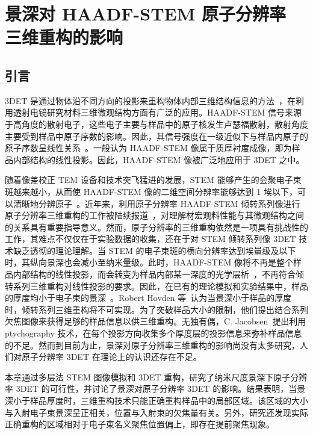 
\clearemptydoublepage
\chapter[景深对 HAADF-STEM 原子分辨率三维重构的影响]{景深对 HAADF-STEM 原子分辨率\\三维重构的影响}
\section{引言}
3DET 是通过物体沿不同方向的投影来重构物体内部三维结构信息的方法~\cite{Frank2006,Kubel2005}，在利用透射电镜研究材料三维微观结构方面有广泛的应用。HAADF-STEM 信号来源于高角度的散射电子，这些电子主要与样品中的原子核发生卢瑟福散射，散射角度主要受到样品中原子序数的影响。因此，其信号强度在一级近似下与样品内原子的原子序数呈线性关系~\cite{Midgley2003}。一般认为 HAADF-STEM 像属于质厚衬度成像，即为样品内部结构的线性投影。因此，HAADF-STEM 像被广泛地应用于 3DET 之中。

随着像差校正 TEM 设备和技术突飞猛进的发展，STEM 能够产生的会聚电子束斑越来越小，从而使 HAADF-STEM 像的二维空间分辨率能够达到 1 埃以下，可以清晰地分辨原子~\cite{Haider1998,Hosokawa2013}。近年来，利用原子分辨率 HAADF-STEM 倾转系列像进行原子分辨率三维重构的工作被陆续报道~\cite{Miao2016,Xu2015,Scott2012,VanAert2011,Lu2015,Azubel2014}，对理解材宏观料性能与其微观结构之间的关系具有重要指导意义。然而，原子分辨率的三维重构依然是一项具有挑战性的工作，其难点不仅仅在于实验数据的收集，还在于对 STEM 倾转系列像 3DET 技术缺乏透彻的理论理解。当 STEM 的电子束斑的横向分辨率达到埃量级及以下时，其纵向景深也会减小至纳米量级。此时，HAADF-STEM 像将不再是整个样品内部结构的线性投影，而会转变为样品内部某一深度的光学层析~\cite{Xin2009,Ishikawa2015,Yang2015,Borisevich2006-1,Bosch2020}，不再符合倾转系列三维重构对线性投影的要求。因此，在已有的理论模拟和实验结果中，样品的厚度均小于电子束的景深~\cite{Xu2015,VanAert2011,Aveyard2016}。Robert Hovden 等~\cite{Hovden2014}认为当景深小于样品的厚度时，倾转系列三维重构将不可实现。为了突破样品大小的限制，他们提出结合系列欠焦图像来获得足够的样品信息以供三维重构。无独有偶，C. Jacobsen~\cite{Jacobsen2018}提出利用 ptychography 技术，在每个投影方向收集多个厚度层的投影信息来弥补样品信息的不足。然而到目前为止，景深对原子分辨率三维重构的影响尚没有太多研究，人们对原子分辨率 3DET 在理论上的认识还存在不足。

本章通过多层法 STEM 图像模拟和 3DET 重构，研究了纳米尺度景深下原子分辨率 3DET 的可行性，并讨论了景深对原子分辨率 3DET 的影响。结果表明，当景深小于样品厚度时，三维重构技术只能正确重构样品中的局部区域。该区域的大小与入射电子束景深呈正相关，位置与入射束的欠焦量有关。另外，研究还发现实际正确重构的区域相对于电子束名义聚焦位置偏上，即存在提前聚焦现象。

